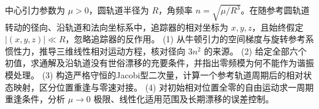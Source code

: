 中心引力参数为 \(\mu>0\)，圆轨道半径为 \(R\)，角频率 \(n=\sqrt{\mu/R^3}\)。在随参考圆轨道转动的径向、沿轨道和法向坐标系中，追踪器的相对坐标为 \(x,y,z\)，且始终假定 \(|(x,y,z)|\ll R\)，忽略追踪器的反作用。
(1) 从牛顿引力的空间梯度与旋转参考系惯性力，推导三维线性相对运动方程，核对径向 \(3n^2\) 的来源。
(2) 给定全部六个初值，求通解及沿轨道没有世俗漂移的充要条件，并指出零频模为何不能作为谐振模处理。
(3) 构造严格守恒的Jacobi型二次量，计算一个参考轨道周期后的相对状态映射，区分位置重逢与零速对接。
(4) 对初始相对位置全零的自由运动求一周期重逢条件，分析 \(\mu\to0\) 极限、线性化适用范围及长期漂移的误差控制。
